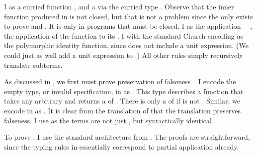 I   \im{\tnfune{\tn:\tApr,\tx:\tA}{\te}}
as a curried function
\im{\sfune{\sn}{\absccmodel{\tApr}}{\sfune{\sx}{\absccmodel{\tA}}{\absccmodel{\te}}}},
and a   \im{\tcodety{\tn:\tApr,\tx:\tA}{\tB}} via the
curried  type
\im{\spity{\sn}{\absccmodel{\tApr}}{\spity{\tx}{\absccmodel{\tA}}{\absccmodel{\tB}}}}.
Observe that the inner function produced in \slang is not closed, but that is
not a problem since the  only exists to prove  and
.
It is only in \tlang programs that  must be closed.
I   \im{\tcloe{\te}{\tepr}}
as the application \im{\sappe{\absccmodel{\te}}{\absccmodel{\tepr}}}---\ie, the application
of the function \im{\absccmodel{\te}} to its  \im{\absccmodel{\tepr}}.
I  \im{\tunite} with the standard Church-encoding as the
polymorphic identity function, since \slang does not include a unit expression.
(We could just as well add a unit expression to \slang.)
All other rules simply recursively translate subterms.

As discussed in , we first must prove preservation of
falseness~.
I encode the empty type, or invalid specification, \im{\tFalse} in \tlang as
\im{\tpity{\tA}{\tpropty}{\tA}}.
This type describes a function that takes any arbitrary 
\im{\tA} and returns a  of \im{\tA}.
There is only a  of \im{\tFalse} if \tlang is not .
Similar, we encode \im{\sFalse} in \slang as
\im{\spity{\sA}{\spropty}{\sA}}.
It is clear from the translation of  that the
translation preserves falseness.
I use \im{=} as the terms are not just , but
syntactically identical.

\begin{lemma}
  \label{sec:m:false-pres}
  \im{\absccmodel{\tFalse} = \sFalse}
\end{lemma}

To prove , I use the standard architecture from
.
The proofs are straightforward, since the typing rules in \tlang essentially
correspond to partial application already.

